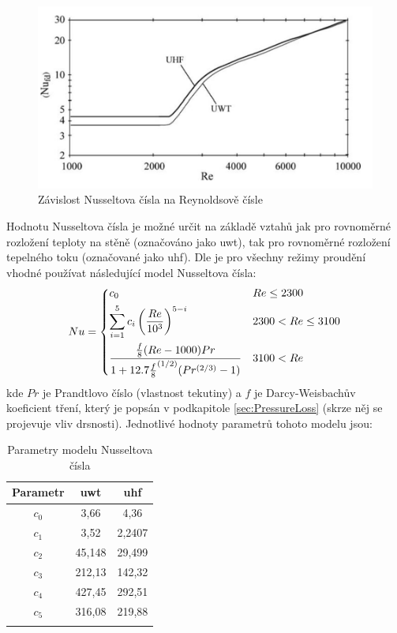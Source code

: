 \begin{figure}[h] \centering \capstart
  \includegraphics[scale=0.3]{figures/nusselt}
  \caption{Závislost Nusseltova čísla na Reynoldsově čísle \cite{Abraham2009}}
  \label{fig:NuReynolds}
\end{figure}
Hodnotu Nusseltova čísla je možné určit na základě vztahů jak pro rovnoměrné
rozložení teploty na stěně (označováno jako \acrshort{uwt}), tak pro rovnoměrné
rozložení tepelného toku (označované jako \acrshort{uhf}). Dle 
\cite{Abraham2009} je pro všechny režimy proudění vhodné používat následující
model Nusseltova čísla:
\begin{equation}
\label{eq:NuModel}
  Nu =
  \begin{dcases}
    c_0 & Re\leq 2300 \\
    \sum_{i=1}^{5} c_i\left(\frac{Re}{10^3}\right)^{5-i} & 2300 < Re\le 3100 \\
    \frac{\frac{f}{8}(Re-1000)Pr}
    {1+12.7{\frac{f}{8}}^{(1/2)}(Pr^{(2/3)}-1)} & 3100 < Re
  \end{dcases}
\end{equation}
kde \(Pr\) je Prandtlovo číslo (vlastnost tekutiny) a \(f\) je Darcy-Weisbachův
koeficient tření, který je popsán v podkapitole \ref{sec:PressureLoss} (skrze
něj se projevuje vliv drsnosti). Jednotlivé hodnoty parametrů tohoto modelu
jsou:
\begin{table}[H]
  \label{tab:NuModel}
  \caption{Parametry modelu Nusseltova čísla}
  \centering
  \begin{tabular}{ccc}
    \toprule
    Parametr & \acrshort{uwt} & \acrshort{uhf} \\ [0.5ex]
    \hline
    \(c_0\) & 3,66 & 4,36 \\
    \(c_1\) & 3,52 & 2,2407 \\
    \(c_2\) & 45,148 & 29,499 \\
    \(c_3\) & 212,13 & 142,32 \\
    \(c_4\) & 427,45 & 292,51 \\
    \(c_5\) & 316,08 & 219,88 \\
    \bottomrule \\[0.1mm]
  \end{tabular}
\end{table}
